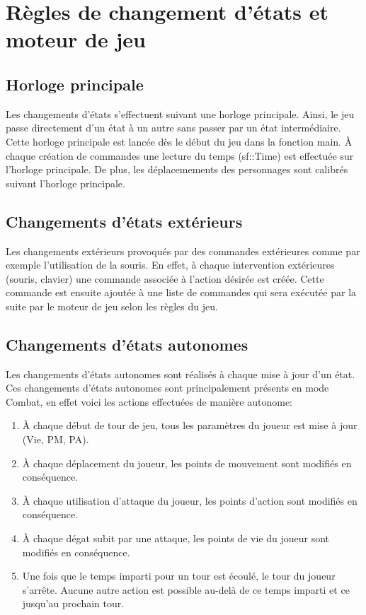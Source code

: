 \documentclass[11pt, a4paper]{article}
\begin{document}
\newpage
\section{Règles de changement d'états et moteur de jeu}
\subsection{Horloge principale}

Les changements d'états s'effectuent suivant une horloge principale. Ainsi, le jeu passe directement d'un état à un autre sans passer par un état intermédiaire. Cette horloge principale est lancée dès le début du jeu dans la fonction main. À chaque création de commandes une lecture du temps (sf::Time) est effectuée sur l'horloge principale. De plus, les déplacemements des personnages sont calibrés suivant l'horloge principale.

\subsection{Changements d'états extérieurs}

Les changements extérieurs provoqués par des commandes extérieures comme par exemple l'utilisation de la souris. En effet, à chaque intervention extérieures (souris, clavier) une commande associée à l'action désirée est créée. Cette commande est ensuite ajoutée à une liste de commandes qui sera exécutée par la suite par le moteur de jeu selon les règles du jeu.

\subsection{Changements d'états autonomes}

Les changements d'états autonomes sont réalisés à chaque mise à jour d'un état. Ces changements d'états autonomes sont principalement présents en mode Combat, en effet voici les actions effectuées de manière autonome:
\begin{enumerate}
 \item À chaque début de tour de jeu, tous les paramètres du joueur est mise à jour (Vie, PM, PA).
 \item À chaque déplacement du joueur, les points de mouvement sont modifiés en conséquence.
 \item À chaque utilisation d'attaque du joueur, les points d'action sont modifiés en conséquence.
 \item À chaque dégat subit par une attaque, les points de vie du joueur sont modifiés en conséquence.
 \item Une fois que le temps imparti pour un tour est écoulé, le tour du joueur s'arrête. Aucune autre action est possible au-delà de ce temps imparti et ce jusqu'au prochain tour.
\end{enumerate}
\end{document}
